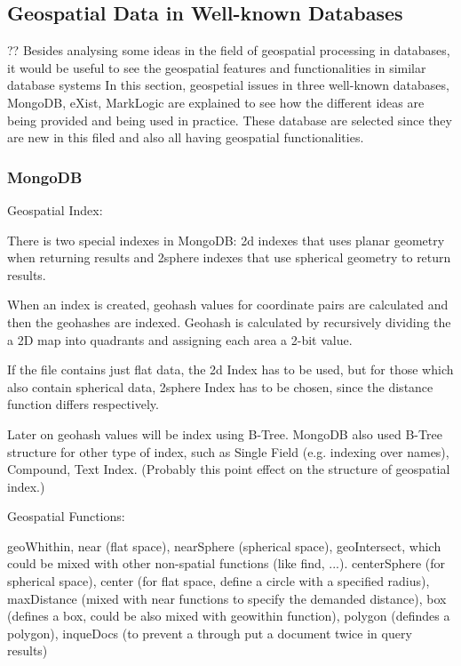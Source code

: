 \documentclass[a4paper,12pt]{article}
\begin{document}
\subsection{Geospatial Data in Well-known Databases} ??
\label{s.dbs}
Besides analysing some ideas in the field of geospatial processing in databases, 
it would be useful to see the geospatial features and functionalities in similar database systems 
In this section, geospetial issues in three well-known databases, MongoDB, eXist, MarkLogic 
are explained to see how the different ideas are being provided and being used in practice. These database are 
selected since they are new in this filed and also all having geospatial functionalities. 


\subsubsection{MongoDB}
\label{mongo}
\cite{mongogeneral2010}
\cite{mongoinaction2011}

Geospatial Index:

There is two special indexes in MongoDB: 2d indexes that uses planar geometry when returning results and 2sphere indexes that use spherical geometry to return results.

When an index is created, geohash values for coordinate pairs are calculated and then the geohashes are indexed.
Geohash is calculated by recursively dividing the a 2D map into quadrants and assigning each area a 2-bit value.


If the file contains just flat data, the 2d Index has to be used, but for those which also contain spherical data, 2sphere Index has to be chosen, since the distance function differs respectively.

Later on geohash values will be index using B-Tree. 
MongoDB also used B-Tree structure for other type of index, such as Single Field (e.g. indexing over names), Compound, Text Index. (Probably this point effect on the structure of geospatial index.)

Geospatial Functions:

geoWhithin, near (flat space), nearSphere (spherical space), geoIntersect, which could be mixed with other non-spatial functions (like find, ...). 
centerSphere (for spherical space), center (for flat space, define a circle with a specified radius), maxDistance (mixed with near functions to specify the demanded distance), box (defines a box, could be also mixed with geowithin function), polygon (defindes a polygon), inqueDocs (to prevent a through put a document twice in query results)
\end{document}
